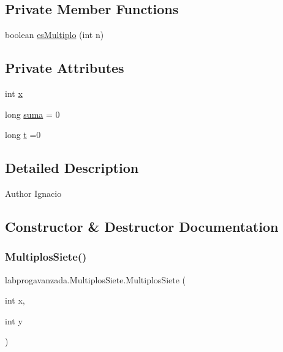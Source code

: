 \subsection*{Private Member Functions}
\begin{DoxyCompactItemize}
\item 
boolean \mbox{\hyperlink{classlabprogavanzada_1_1_multiplos_siete_a586194f8ac6f470f06348ba0868f0c76}{es\+Multiplo}} (int n)
\end{DoxyCompactItemize}
\subsection*{Private Attributes}
\begin{DoxyCompactItemize}
\item 
int \mbox{\hyperlink{classlabprogavanzada_1_1_multiplos_siete_a66b1e8aa9e692a515ca3b2e6a8f9e46f}{x}}
\item 
long \mbox{\hyperlink{classlabprogavanzada_1_1_multiplos_siete_a70d7ed627f4d0c7ebdae178469dbe698}{suma}} = 0
\item 
long \mbox{\hyperlink{classlabprogavanzada_1_1_multiplos_siete_a406ca832e3291aaadc80bc4fc7cad9b0}{t}} =0
\end{DoxyCompactItemize}


\subsection{Detailed Description}
\begin{DoxyAuthor}{Author}
Ignacio 
\end{DoxyAuthor}


\subsection{Constructor \& Destructor Documentation}
\mbox{\label{classlabprogavanzada_1_1_multiplos_siete_a3fb19a45282517894ab06ba0238a6ad8}} 
\subsubsection{\texorpdfstring{Multiplos\+Siete()}{MultiplosSiete()}}
{\footnotesize\ttfamily labprogavanzada.\+Multiplos\+Siete.\+Multiplos\+Siete (\begin{DoxyParamCaption}\item[{int}]{x,  }\item[{int}]{y }\end{DoxyParamCaption})\hspace{0.3cm}{\ttfamily [inline]}}


